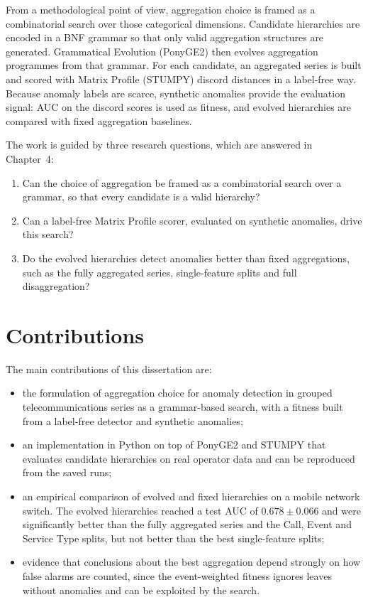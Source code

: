 From a methodological point of view, aggregation choice is framed as a combinatorial search over those categorical dimensions.
Candidate hierarchies are encoded in a \ac{BNF} grammar so that only valid aggregation structures are generated.
Grammatical Evolution (PonyGE2) then evolves aggregation programmes from that grammar.
For each candidate, an aggregated series is built and scored with Matrix Profile (STUMPY) discord distances in a label-free way.
Because anomaly labels are scarce, synthetic anomalies provide the evaluation signal: \ac{AUC} on the discord scores is used as fitness, and evolved hierarchies are compared with fixed aggregation baselines.

The work is guided by three research questions, which are answered in Chapter~4:
\begin{enumerate}
    \item Can the choice of aggregation be framed as a combinatorial search over a grammar, so that every candidate is a valid hierarchy?
    \item Can a label-free Matrix Profile scorer, evaluated on synthetic anomalies, drive this search?
    \item Do the evolved hierarchies detect anomalies better than fixed aggregations, such as the fully aggregated series, single-feature splits and full disaggregation?
\end{enumerate}

\section{Contributions}

The main contributions of this dissertation are:
\begin{itemize}
    \item the formulation of aggregation choice for anomaly detection in grouped telecommunications series as a grammar-based search, with a fitness built from a label-free detector and synthetic anomalies;
    \item an implementation in Python on top of PonyGE2 and STUMPY that evaluates candidate hierarchies on real operator data and can be reproduced from the saved runs;
    \item an empirical comparison of evolved and fixed hierarchies on a mobile network switch. The evolved hierarchies reached a test \ac{AUC} of $0.678 \pm 0.066$ and were significantly better than the fully aggregated series and the Call, Event and Service Type splits, but not better than the best single-feature splits;
    \item evidence that conclusions about the best aggregation depend strongly on how false alarms are counted, since the event-weighted fitness ignores leaves without anomalies and can be exploited by the search.
\end{itemize}

